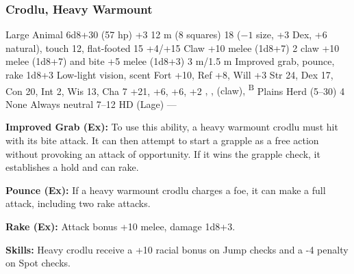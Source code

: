 \subsubsection{Crodlu, Heavy Warmount}
\begin{MonsterStats}
{Large Animal}
{6d8+30 (57 hp)}
{+3}
{12 m (8 squares)}
{18 ($-1$ size, +3 Dex, +6 natural), touch 12, flat-footed 15}
{+4/+15}
{Claw +10 melee (1d8+7)}
{2 claw +10 melee (1d8+7) and bite +5 melee (1d8+3)}
{3 m/1.5 m}
{Improved grab, pounce, rake 1d8+3}
{Low-light vision, scent}
{Fort +10, Ref +8, Will +3}
{Str 24, Dex 17, Con 20, Int 2, Wis 13, Cha 7}
{ +21,  +6,  +6,  +2}
{, ,  (claw), \textsuperscript{B}}
{Plains}
{Herd (5--30)}
{4}
{None}
{Always neutral}
{7--12 HD (Lage)}
{---}
\end{MonsterStats}

\textbf{Improved Grab (Ex):} To use this ability, a heavy warmount crodlu must hit with its bite attack. It can then attempt to start a grapple as a free action without provoking an attack of opportunity. If it wins the grapple check, it establishes a hold and can rake.

\textbf{Pounce (Ex):} If a heavy warmount crodlu charges a foe, it can make a full attack, including two rake attacks.

\textbf{Rake (Ex):} Attack bonus +10 melee, damage 1d8+3.

\textbf{Skills:} Heavy crodlu receive a +10 racial bonus on Jump checks and a -4 penalty on Spot checks.
